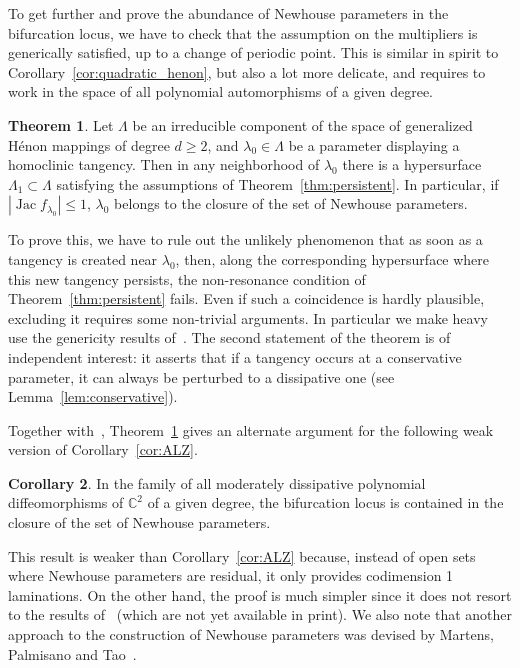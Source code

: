 \documentclass[11pt, oneside]{amsart}
\newcommand{\C}{\mathbb{C}}
\newcommand{\abs}[1]{\left\vert#1\right\vert}
\newcommand{\lo}{{\lambda_0}}
\DeclareMathOperator{\jac}{Jac}
\theoremstyle{remark}
\theoremstyle{definition}
\theoremstyle{theorem}
\newtheorem{mthmB}{Theorem}
\newtheorem{mcorB}[mthmB]{Corollary}
\newcommand{\commentaire}[1]{}
\begin{document}
To get further and prove the abundance of Newhouse parameters in the bifurcation locus,
 we have to check that the assumption on the multipliers is generically satisfied, up to a change of periodic point. This is similar in spirit to Corollary~\ref{cor:quadratic_henon}, 
 but also a lot more delicate, and requires to work in the space of all 
 polynomial automorphisms of a given degree.
 
\begin{mthmB}\label{thm:newhouse_henon}
Let $\Lambda$ be an irreducible component of the space of generalized 
Hénon mappings of degree $d\geq 2$, and $\lo\in \Lambda$ be a   
parameter displaying a  homoclinic tangency. Then in any neighborhood of
 $\lo$ there is a    hypersurface $\Lambda_1\subset \Lambda$ 
 satisfying the assumptions of Theorem~\ref{thm:persistent}. 
 In particular, if $\abs{\jac f_\lo}\leq 1$,   $\lo$ belongs to 
  the closure of the set of Newhouse parameters.
\end{mthmB}

To prove this, we have to rule out the   unlikely phenomenon that as soon as a 
tangency is created  near $\lo$, then,
 along the corresponding hypersurface where this new tangency 
persists, the non-resonance condition of Theorem~\ref{thm:persistent} fails. 
Even if  such a coincidence is hardly plausible, excluding  it requires some non-trivial  
arguments. In particular we make heavy    use the genericity 
 results of~\cite{BHI}. The second statement of the theorem is of independent interest: it asserts that
  if a tangency occurs at a conservative parameter, it can always be perturbed to a dissipative one (see Lemma~\ref{lem:conservative}). \commentaire{cf. Major remark \#3}

 
Together with~\cite{tangencies},  Theorem~\ref{thm:newhouse_henon}
 gives an alternate argument  for the following weak
version of Corollary~\ref{cor:ALZ}. 

\begin{mcorB} \label{cor:newhouse_henon}
In the   family of all moderately dissipative polynomial  diffeomorphisms of $\C^2$ of a given degree, 
the bifurcation locus is contained in 
the closure of the  set of Newhouse parameters. 
\end{mcorB}
 
This result is     weaker than Corollary~\ref{cor:ALZ} because,   instead of   
open sets where Newhouse parameters are residual, it only provides codimension 1 laminations. 
On the other hand, the proof is  much  simpler since it does not 
resort to the results of~\cite{avila-lyubich-zhang} (which are not yet available in print). 
We also note that  
another approach to the construction of 
Newhouse parameters was  devised by  
Martens, Palmisano and Tao~\cite{martens-palmisano-tao}.
\end{document}
